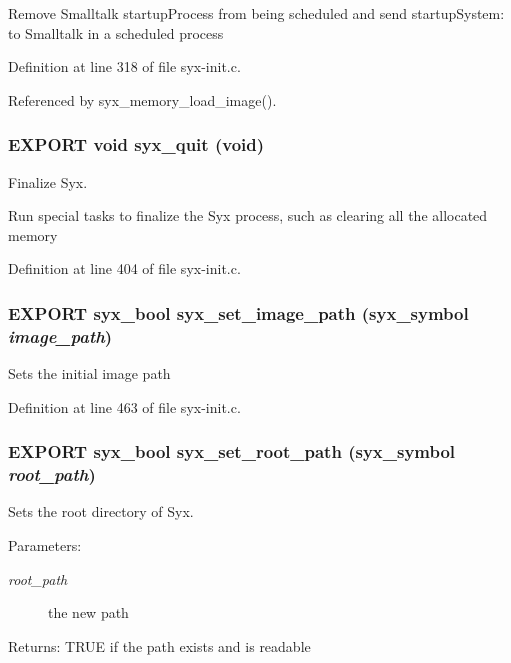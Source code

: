 Remove Smalltalk startupProcess from being scheduled and send startupSystem: to Smalltalk in a scheduled process 

Definition at line 318 of file syx-init.c.

Referenced by syx\_\-memory\_\-load\_\-image().\hypertarget{syx-init_8h_ce263c15141e6de68d951cfc57d672cb}{
\subsubsection{\setlength{\rightskip}{0pt plus 5cm}EXPORT void syx\_\-quit (void)}}
\label{syx-init_8h_ce263c15141e6de68d951cfc57d672cb}


Finalize Syx.

Run special tasks to finalize the Syx process, such as clearing all the allocated memory 

Definition at line 404 of file syx-init.c.\hypertarget{syx-init_8h_e2d4b8ca450daf0766f0ce2e1ce73c54}{
\subsubsection{\setlength{\rightskip}{0pt plus 5cm}EXPORT {\bf syx\_\-bool} syx\_\-set\_\-image\_\-path ({\bf syx\_\-symbol} {\em image\_\-path})}}
\label{syx-init_8h_e2d4b8ca450daf0766f0ce2e1ce73c54}


Sets the initial image path 

Definition at line 463 of file syx-init.c.\hypertarget{syx-init_8h_26e334bd4520a346fe829903993f250e}{
\subsubsection{\setlength{\rightskip}{0pt plus 5cm}EXPORT {\bf syx\_\-bool} syx\_\-set\_\-root\_\-path ({\bf syx\_\-symbol} {\em root\_\-path})}}
\label{syx-init_8h_26e334bd4520a346fe829903993f250e}


Sets the root directory of Syx.

\begin{Desc}
\item[Parameters:]
\begin{description}
\item[{\em root\_\-path}]the new path \end{description}
\end{Desc}
\begin{Desc}
\item[Returns:]TRUE if the path exists and is readable \end{Desc}


